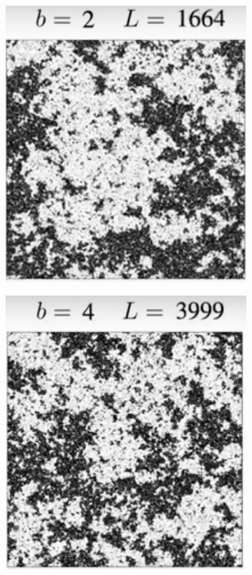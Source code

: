 \documentclass[]{article}
\begin{document}
\begin{figure}[H]
	\caption{Evolving $T=1.003T_c$ after \cite{ashton2012renormalization}}
	\begin{subfigure}[t]{0.3\textwidth}
		\includegraphics[width=\textwidth]{DouglasAshton2-1}
	\end{subfigure}
	\begin{subfigure}[t]{0.3\textwidth}
		\includegraphics[width=\textwidth]{DouglasAshton2-2}

\end{subfigure}
\end{figure}
\end{document}
